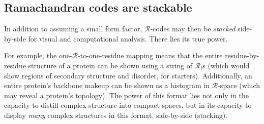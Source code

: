 \documentclass[fleqn,10pt,lineno]{wlpeerj} %
\begin{document}
\subsection*{Ramachandran codes are stackable}

In addition to assuming a small form factor, $\mathcal{R}$-codes may then be \textit{stacked} side-by-side for visual and computational analysis. There lies its true power.

For example, the one-$\mathcal{R}$-to-one-residue mapping means that the entire residue-by-residue structure of a protein can be shown using a string of $\mathcal{R}_i$s (which would show regions of secondary structure and disorder, for starters). Additionally, an entire protein's backbone makeup can be shown as a histogram in $\mathcal{R}$-space (which may reveal a protein's topology). The power of this format lies not only in the capacity to distill complex structure into compact spaces, but in its capacity to display {\it many} complex structures in this format, side-by-side (stacking).
\end{document}
